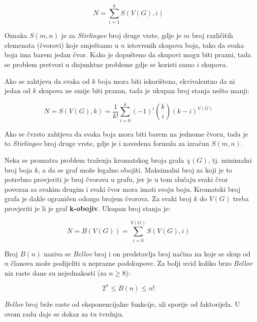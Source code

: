 \documentclass[times, utf8, diplomski, numeric]{fer}
\begin{document}
\begin{equation}
N = \sum_{i=1}^{k} S(V(G), i)
\end{equation}

Oznaka $S(m,n)$ je za \emph{Stirlingov} broj druge vrste, gdje je $m$ broj različitih elemenata (čvorovi) koje smještamo u $n$ istovrsnih skupova boja, tako da svaka boja ima barem jedan čvor. Kako je dopušteno da skupovi mogu biti prazni, tada se problem pretvori u disjunktne probleme gdje se koristi samo $i$ skupova. 

Ako se zahtjeva da svaka od $k$ boja mora biti iskorištena, ekvivalentno da ni jedan od $k$ skupova ne smije biti prazan, tada je ukupan broj stanja nešto manji:

\begin{equation}
N = S(V(G), k) = \frac{1}{k!}\sum_{i=0}^{k} (-1)^i \binom{k}{i}(k-i)^{V(G)}  
\end{equation}

Ako se čvrsto zahtjeva da svaka boja mora biti barem na jednome čvoru, tada je to \emph{Stirlingov} broj druge vrste, gdje je i navedena formula za izračun $S(m,n)$.

Neka se promatra problem traženja kromatskog broja grafa $\chi(G)$, tj. minimalni broj boja $k$, a da se graf može legalno obojiti. Maksimalni broj za koji je to potrebno provjeriti je broj čvorova u grafu, jer je u tom slučaju svaki čvor povezan sa svakim drugim i svaki čvor mora imati svoju boju. Kromatski broj grafa je dakle ograničen odozgo brojem čvorova. Za svaki broj $k$ do $V(G)$ treba provjeriti je li je graf \textbf{k-obojiv}. Ukupan broj stanja je:

\begin{equation}
N = B(V(G)) = \sum_{i=0}^{V(G)} S(V(G), i)
\end{equation}

Broj $B(n)$ naziva se \emph{Bellov} broj i on predstavlja broj načina na koje se skup od $n$ članova može podijeliti u neprazne podskupove. Za bolji uvid koliko brzo \emph{Bellov} niz raste dane su nejednakosti (za $n\ge 8$): 

\begin{equation}
2^n \le B(n) \le n! 
\end{equation}

\emph{Bellov} broj brže raste od eksponencijalne funkcije, ali sporije od faktorijela. U ovom radu daje se dokaz za tu tvrdnju.
\end{document}
